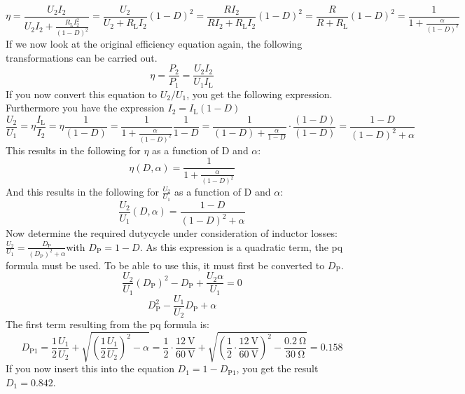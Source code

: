 \begin{solutionblock}
\begin{equation}
    \eta=\frac{U_\mathrm{2}I_\mathrm{2}}{U_\mathrm{2}I_\mathrm{2}+\frac{ R_\mathrm{L}I_\mathrm{2}^2}{(1-D)^2}}=\frac{U_\mathrm{2}}{U_\mathrm{2}+R_\mathrm{L}I_\mathrm{2}}{(1-D)^2}=\frac{RI_\mathrm{2}}{RI_\mathrm{2}+R_\mathrm{L}I_\mathrm{2}}{(1-D)^2}=\frac{R}{R+R_\mathrm{L}}{(1-D)^2}=\frac{1}{1+\frac{\alpha}{(1-D)^2}}
    \label{eq:efficiencyOverD}
\end{equation}
If we now look at the original efficiency equation again, the following transformations can be carried out.
\begin{equation}
    \eta=\frac{P_\mathrm{2}}{P_\mathrm{1}} = \frac{U_\mathrm{2}I_\mathrm{2}}{U_\mathrm{1}I_\mathrm{L}}
\end{equation}
If you now convert this equation to $U_\mathrm{2}/U_\mathrm{1}$, you get the following expression. Furthermore you have the expression $I_\mathrm{2}=I_\mathrm{L}(1-D)$
\begin{equation}
    \frac{U_\mathrm{2}}{U_\mathrm{1}}=\eta \frac{I_\mathrm{L}}{I_\mathrm{2}}= \eta \frac{1}{(1-D)}=\frac{1}{1+\frac{\alpha}{(1-D)^2}}\frac{1}{1-D}=\frac{1}{(1-D)+\frac{\alpha}{1-D}}\cdot \frac{(1-D)}{(1-D)}=\frac{1-D}{(1-D)^2+\alpha}
    \label{eq:voltageRatioOverD}
\end{equation}
This results in the following for $\eta$ as a function of D and $\alpha$:
\begin{equation}
    \eta(D,\alpha)=\frac{1}{1+\frac{\alpha}{(1-D)^2}}
\end{equation}
And this results in the following for $\frac{U_\mathrm{2}}{U_\mathrm{1}}$ as a function of D and $\alpha$:
\begin{equation}
    \frac{U_\mathrm{2}}{U_\mathrm{1}}(D,\alpha)=\frac{1-D}{(1-D)^2+\alpha}
\end{equation}
Now determine the required dutycycle under consideration of inductor losses:
$\frac{U_\mathrm{2}}{U_\mathrm{1}}=\frac{D_\mathrm{P}}{(D_\mathrm{P})^2+\alpha}$with $D_\mathrm{P}=1-D$.
As this expression is a quadratic term, the pq formula must be used. To be able to use this, it must first be converted to $D_\mathrm{P}$.
\begin{equation}
    \frac{U_\mathrm{2}}{U_\mathrm{1}}(D_\mathrm{P})^2-D_\mathrm{P}+\frac{U_\mathrm{2}\alpha}{U_\mathrm{1}}=0
\end{equation}
\begin{equation}
    D_\mathrm{P}^2 - \frac{U_\mathrm{1}}{U_\mathrm{2}} D_\mathrm{P}+\alpha
\end{equation}
The first term resulting from the pq formula is:
\begin{equation}
    D_\mathrm{P1}=\frac{1}{2}\frac{U_\mathrm{1}}{U_\mathrm{2}}+\sqrt{(\frac{1}{2}\frac{U_\mathrm{1}}{U_\mathrm{2}})^2-\alpha}= \frac{1}{2}\cdot\frac{\SI{12}{\volt}}{\SI{60}{\volt}}+\sqrt{({\frac{1}{2}}\cdot\frac{\SI{12}{\volt}}{\SI{60}{\volt}})^2-\frac{\SI{0.2}{\ohm}}{\SI{30}{\ohm}}}= 0.158
\end{equation}
If you now insert this into the equation $D_\mathrm{1}=1-D_\mathrm{P1}$, you get the result $D_\mathrm{1}=0.842$.


\end{solutionblock}
